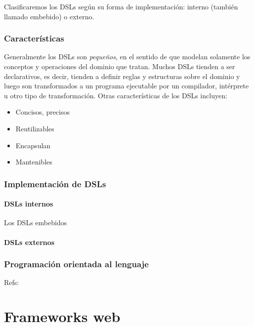 \documentclass[12pt]{report}
\begin{document}
Clasificaremos los DSLs según su forma de implementación: interno (también llamado embebido) o externo.

\subsection{Caracter\'isticas}

Generalmente los DSLs son \textit{pequeños}, en el sentido de que modelan solamente los conceptos y operaciones del dominio que tratan. Muchos DSLs tienden a ser declarativos, es decir, tienden a definir reglas y estructuras sobre el dominio y luego son transformados a un programa ejecutable por un compilador, intérprete u otro tipo de transformación. \cite{van2000domain}
Otras características de los DSLs incluyen: \cite{van2000domain}

\begin{itemize}
	\item Concisos, precisos
	\item Reutilizables
	\item Encapsulan 
	\item Mantenibles \cite{van1998little}
\end{itemize}



\subsection{Implementaci\'on de DSLs}

\subsubsection{DSLs internos}

Los DSLs embebidos 

\subsubsection{DSLs externos}

\subsection{Programación orientada al lenguaje}

Refs:

\cite{Ward95languageoriented}
\cite{dmitriev2005language}

\chapter{Frameworks web}
\end{document}
